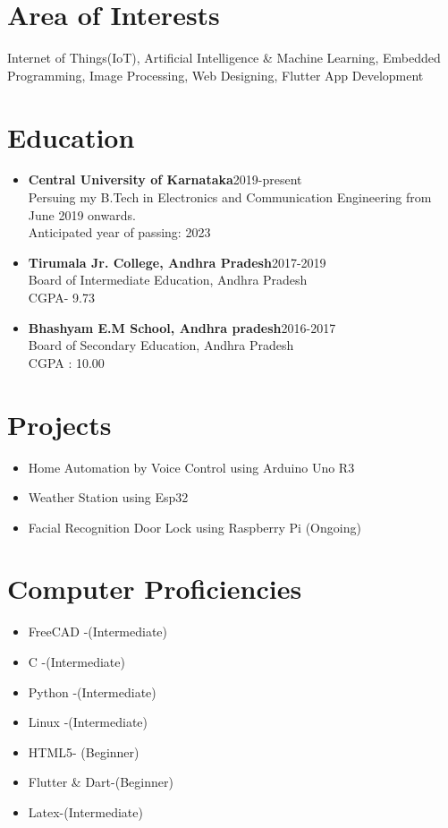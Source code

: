 \documentclass[]{article}
\begin{document}
    \section{Area of Interests}
    Internet of Things(IoT), Artificial Intelligence \& Machine Learning, Embedded Programming, Image Processing, Web Designing, Flutter App Development
    \section{Education} %
    \begin{itemize}
        \item \textbf{Central University of Karnataka}\hspace{7.1cm}2019-present\\Persuing my B.Tech in Electronics and Communication Engineering from June 2019 onwards.\\Anticipated year of passing: 2023
        \item \textbf{Tirumala Jr. College, Andhra Pradesh}\hspace{6cm}2017-2019\\Board of Intermediate Education, Andhra Pradesh\\CGPA- 9.73
        \item \textbf{Bhashyam E.M School, Andhra pradesh}\hspace{5.8cm}2016-2017\\Board of Secondary Education, Andhra Pradesh\\CGPA : 10.00
    \end{itemize} %
    \section{Projects}
    \begin{itemize}
        \item Home Automation by Voice Control using Arduino Uno R3
        \item Weather Station using Esp32
        \item Facial Recognition Door Lock using Raspberry Pi (Ongoing)
    \end{itemize}
    \section{Computer Proficiencies}
    \begin{multicols}{2}[]
    \begin{itemize}
        \item FreeCAD -(Intermediate)
        \item C -(Intermediate)
        \item Python -(Intermediate)
        \item Linux -(Intermediate)
        \item HTML5- (Beginner)
        \item Flutter \& Dart-(Beginner)
        \item Latex-(Intermediate)
    \end{itemize}
    \end{multicols}
\end{document}
